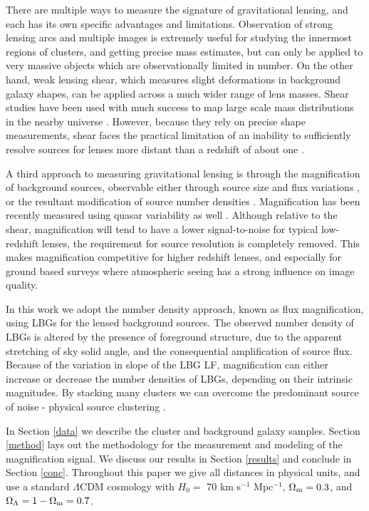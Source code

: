 There are multiple ways to measure the signature of gravitational lensing, and each has its own specific advantages and limitations. Observation of strong lensing arcs and multiple images is extremely useful for studying the innermost regions of clusters, and getting precise mass estimates, but can only be applied to very massive objects which are observationally limited in number. On the other hand, weak lensing shear, which measures slight deformations in background galaxy shapes, can be applied across a much wider range of lens masses. Shear studies have been used with much success to map large scale mass distributions in the nearby universe \citep{Waerbeke13, Massey07}. However, because they rely on precise shape measurements, shear faces the practical limitation of an inability to sufficiently resolve sources for lenses more distant than a redshift of about one \citep{LHJM10}.

A third approach to measuring gravitational lensing is through the magnification of background sources, observable either through source size and flux variations \citep{Schmidt12,Huff14}, or the resultant modification of source number densities \citep{Ford12, Morrison12, Hildebrandt13, Hildebrandt11, Hildebrandt09b, Scranton05}. Magnification has been recently measured using quasar variability as well \citep{Bauer11}. Although relative to the shear, magnification will tend to have a lower signal-to-noise for typical low-redshift lenses, the requirement for source resolution is completely removed. This makes magnification competitive for higher redshift lenses, and especially for ground based surveys where atmospheric seeing has a strong influence on image quality.

In this work we adopt the number density approach, known as flux magnification, using \ac{LBG}s for the lensed background sources. The observed number density of \ac{LBG}s is altered by the presence of foreground structure, due to the apparent stretching of sky solid angle, and the consequential amplification of source flux. Because of the variation in slope of the \ac{LBG} \ac{LF}, magnification can either increase or decrease the number densities of \ac{LBG}s, depending on their intrinsic magnitudes. By stacking many clusters we can overcome the predominant source of noise - physical source clustering \citep{Hildebrandt11}. 

In Section \ref{data} we describe the cluster and background galaxy samples. Section \ref{method} lays out the methodology for the measurement and modeling of the magnification signal. We discuss our results in Section \ref{results} and conclude in Section \ref{conc}. Throughout this paper we give all distances in physical units, and use a standard $\Lambda$CDM cosmology with $H_0 =$ 70 km s$^{-1}$ Mpc$^{-1}$, $\Omega_{\rm m} = 0.3$, and $\Omega_{\Lambda} = 1 - \Omega_{\rm m} = 0.7$.

